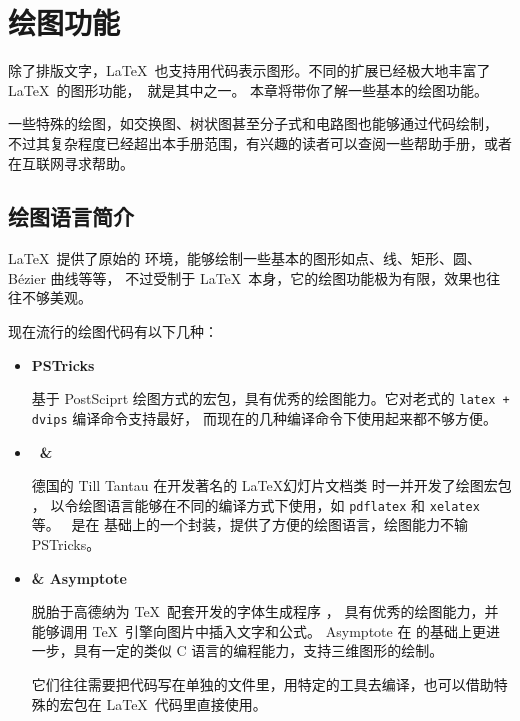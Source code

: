 \chapter{绘图功能}

\begin{intro}
除了排版文字，\LaTeX\ 也支持用代码表示图形。不同的扩展已经极大地丰富了 \LaTeX\ 的图形功能，\TikZ\ 就是其中之一。
本章将带你了解一些基本的绘图功能。

一些特殊的绘图，如交换图、树状图甚至分子式和电路图也能够通过代码绘制，
不过其复杂程度已经超出本手册范围，有兴趣的读者可以查阅一些帮助手册，或者在互联网寻求帮助。
\end{intro}

\section{绘图语言简介}\label{sec:pict-lang}

\LaTeX\ 提供了原始的  环境，能够绘制一些基本的图形如点、线、矩形、圆、B\'ezier 曲线等等，
不过受制于 \LaTeX\ 本身，它的绘图功能极为有限，效果也往往不够美观。

现在流行的绘图代码有以下几种：
\begin{itemize}
  \item \textbf{PSTricks} \par
  基于 PostSciprt 绘图方式的宏包，具有优秀的绘图能力。它对老式的 \texttt{latex + dvips} 编译命令支持最好，
  而现在的几种编译命令下使用起来都不够方便。

  \item \textbf{\TikZ\ \& } \par
  德国的 Till Tantau 在开发著名的 \LaTeX 幻灯片文档类  时一并开发了绘图宏包 ，
  以令绘图语言能够在不同的编译方式下使用，如 \texttt{pdflatex} 和 \texttt{xelatex} 等。
  \TikZ\ 是在  基础上的一个封装，提供了方便的绘图语言，绘图能力不输 PSTricks。

  \item \textbf{ \& Asymptote} \par
   脱胎于高德纳为 \TeX\ 配套开发的字体生成程序 ，
  具有优秀的绘图能力，并能够调用 \TeX\ 引擎向图片中插入文字和公式。
  Asymptote 在  的基础上更进一步，具有一定的类似 C 语言的编程能力，支持三维图形的绘制。\par
  它们往往需要把代码写在单独的文件里，用特定的工具去编译，也可以借助特殊的宏包在 \LaTeX\ 代码里直接使用。
\end{itemize}

